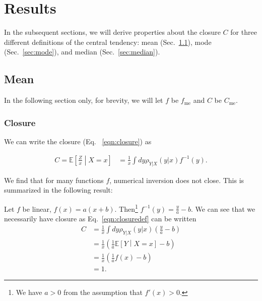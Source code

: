 \section{Results}

In the subsequent sections, we will derive properties about the closure $C$ for three different definitions of the central tendency: mean (Sec.~\ref{sec:mean}), mode (Sec.~\ref{sec:mode}), and median (Sec.~\ref{sec:median}).

\subsection{Mean}
\label{sec:mean}

In the following section only, for brevity, we will let $f$ be $f_\text{me}$ and $C$ be $C_\text{me}$.
\subsubsection{Closure}
\label{sec:meanclosuresection}

We can write the closure (Eq. ~\ref{eqn:closure}) as

\begin{align}
C = \mathbb{E}\left[\frac{Z}{x}\middle| X=x\right] &=\frac{1}{x} \int dy \rho_{Y|X}(y|x) f^{-1}(y).
\label{eqn:closuredef}
\end{align}

We find that for many functions $f$, numerical inversion does not close. This is summarized in the following result:

\vspace{5mm}


\vspace{5mm}

Let $f$ be linear, $f(x) = a(x+b)$. Then\footnote{We have $a>0$ from the assumption that $f'(x)>0$.} $f^{-1}(y) = \frac{y}{a}-b$. We can see that we necessarily have closure as Eq.~\ref{eqn:closuredef} can be written
\begin{align}
C &=\frac{1}{x} \int dy \rho_{Y|X}(y|x) \left(\frac{y}{a}-b\right)\nonumber\\
&=\frac{1}{x} \left(\frac{1}{a}\mathbb{E}\left[Y\middle| X=x\right]-b\right)\nonumber\\
&=\frac{1}{x} \left(\frac{1}{a}f(x)-b\right)\nonumber\\
&=1.
\label{eqn:closure_linear_proof}
\end{align}

